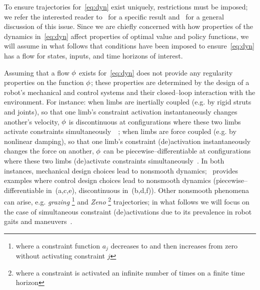 \documentclass{article}
\begin{document}
To ensure trajectories for~\eqref{eq:dyn} exist uniquely, restrictions must be imposed; we refer the interested reader to~\cite[Thm.~10]{Ballard2000-ui} for a specific result and~\cite{Johnson2016-nh} for a general discussion of this issue.
Since we are chiefly concerned with how properties of the dynamics in~\eqref{eq:dyn} affect properties of optimal value and policy functions, 
we will assume in what follows that conditions have been imposed to ensure~\eqref{eq:dyn} has a flow for states, inputs, and time horizons of interest.


Assuming that a flow $\phi$ exists for~\eqref{eq:dyn} does not provide any regularity properties on the function $\phi$;
these properties are determined by 
the design of a robot's mechanical and control systems 
and
their closed--loop interaction with the environment.
For instance: 
when limbs are inertially coupled (e.g. by rigid struts and joints), so that one limb's constraint activation instantaneously changes another's velocity, $\phi$ is discontinuous at configurations where these two limbs activate constraints simultaneously~\cite[Table~3]{Remy2010-vo}~\cite{Hurmuzlu1994-wk};
when limbs are force coupled (e.g. by nonlinear damping), so that one limb's constraint (de)activation instantaneously changes the force on another, $\phi$ can be piecewise--differentiable at configurations where these two limbs (de)activate constraints simultaneously~\cite[Fig.~1]{Pace2017-tt}.
In both instances, mechanical design choices lead to nonsmooth dynamics;~ provides examples where control design choices lead to nonsmooth dynamics (piecewise--differentiable in~(a,c,e), discontinuous in~(b,d,f)).
Other nonsmooth phenomena can arise, e.g. 
\emph{grazing}%
\footnote{where a constraint function $a_j$ decreases to and then increases from zero without activating constraint $j$}
and
\emph{Zeno}%
\footnote{where a constraint is activated an infinite number of times on a finite time horizon}
trajectories;
in what follows we will focus on the case of simultaneous constraint (de)activations due to its prevalence in robot gaits and maneuvers~. 
\end{document}
